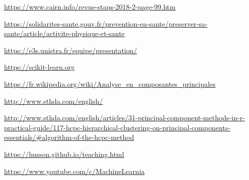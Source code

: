 \documentclass[12pt]{article}
\begin{document}
\begin{thebibliography}{9}

\url{https://www.cairn.info/revue-staps-2018-2-page-99.htm}


\url{https://solidarites-sante.gouv.fr/prevention-en-sante/preserver-sa-sante/article/activite-physique-et-sante}

\url{https://e3s.unistra.fr/equipe/presentation/}

\url{https://scikit-learn.org}

\bibitem{}
\url{https://fr.wikipedia.org/wiki/Analyse_en_composantes_principales}


\url{http://www.sthda.com/english/}

\url{http://www.sthda.com/english/articles/31-principal-component-methods-in-r-practical-guide/117-hcpc-hierarchical-clustering-on-principal-components-essentials/#algorithm-of-the-hcpc-method}


\url{https://husson.github.io/teaching.html}


\url{https://www.youtube.com/c/MachineLearnia}

\url{}

\end{thebibliography}
\end{document}
